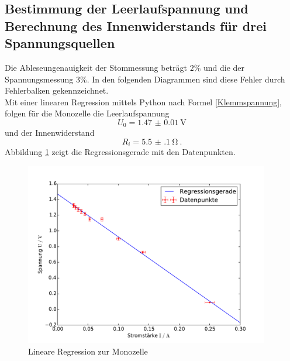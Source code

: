 \subsection{Bestimmung der Leerlaufspannung und Berechnung des Innenwiderstands für drei Spannungsquellen}
Die Ableseungenauigkeit der Stommessung beträgt $2 \% $ und die der Spannungsmessung $3 \% $. In den folgenden Diagrammen sind diese Fehler durch Fehlerbalken gekennzeichnet. \\
Mit einer linearen Regression mittels Python nach Formel \eqref{Klemmspannung}, folgen für die Monozelle die Leerlaufspannung
\[U_0 = \SI{1.47(1)}{\volt}\]
und der Innenwiderstand
\[\label{Innenwiderstand_Monozelle}
R_i = \SI{5.5(1)}{\ohm} \ .\]
Abbildung \ref{fig:Regression_Monozelle} zeigt die Regressionsgerade mit den Datenpunkten.
\begin{figure}[h!]
	\centering
	\includegraphics[width=0.95\textwidth]{Spannung_Messung_b.pdf}
	\caption{Lineare Regression zur Monozelle}
	\label{fig:Regression_Monozelle}
\end{figure}

